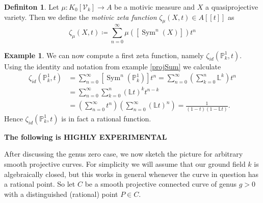 \documentclass[11pt, a4paper, german]{article}
\theoremstyle{plain}
\theoremstyle{definition}
\newtheorem{definition}[theorem]{Definiton}
\newtheorem{example}[theorem]{Example}
\newcommand{\gring}[1][k]{K_0[\mathcal{V}_#1]}
\DeclareMathOperator{\Sym}{Sym}
\begin{document}
\begin{definition}
    Let $\mu \colon \gring \to A$ be a motivic measure and $X$ a quasiprojective variety. Then we define the \emph{motivic zeta function} 
    $\zeta_{\mu}(X,t) \in A[[t]]$ as
    \[
        \zeta_{\mu}(X,t) \coloneqq \sum_{n=0}^\infty \mu([\Sym^n(X)])t^n
    \]
\end{definition}

\begin{example}
    We can now compute a first zeta function, namely $\zeta_{id}(\mathbb{P}_k^1, t)$. Using the identity and notation from example \ref{projSum}
    we calculate
    \begin{align*}
        \zeta_{id}(\mathbb{P}_k^1, t) & = \sum_{n=0}^\infty \left[\Sym^n({\mathbb{P}_k^1})\right]t^n 
                                       = \sum_{n=0}^\infty \left(\sum_{k=0}^n \mathbb{L}^k\right) t^n \\
                                       & = \sum_{n=0}^\infty \sum_{k=0}^n \left(\mathbb{L}t\right)^k t^{n-k} \\
                                      & = \left( \sum_{n=0}^\infty t^n \right) \left( \sum_{n=0}^\infty (\mathbb{L}t)^n \right) 
                                        = \frac{1}{(1-t)(1-\mathbb{L}t)} .%
    \end{align*}
    Hence $\zeta_{id}(\mathbb{P}_k^1, t)$ is in fact a rational function.
\end{example}

\textbf{The following is HIGHLY EXPERIMENTAL}

After discussing the genus zero case, we now sketch the picture for arbitrary smooth projective curves. 
For simplicity we will assume that our ground field $k$ is algebraically closed, but
this works in general whenever the curve in question has a rational point. 
So let $C$ be a smooth projective connected curve of genus $g > 0$ with a distinguished (rational) point $P \in C$.
\end{document}
